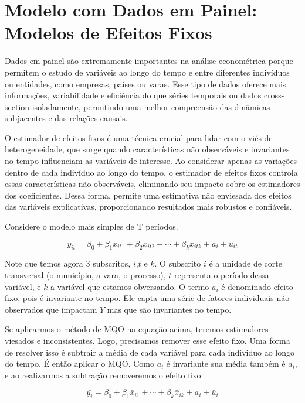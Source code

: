 \documentclass[
  letterpaper,
  DIV=11,
  numbers=noendperiod]{scrreprt}
\begin{document}
\section{Modelo com Dados em Painel: Modelos de Efeitos
Fixos}\label{modelo-com-dados-em-painel-modelos-de-efeitos-fixos}

Dados em painel são extremamente importantes na análise econométrica
porque permitem o estudo de variáveis ao longo do tempo e entre
diferentes indivíduos ou entidades, como empresas, países ou varas. Esse
tipo de dados oferece mais informações, variabilidade e eficiência do
que séries temporais ou dados cross-section isoladamente, permitindo uma
melhor compreensão das dinâmicas subjacentes e das relações causais.

O estimador de efeitos fixos é uma técnica crucial para lidar com o viés
de heterogeneidade, que surge quando características não observáveis e
invariantes no tempo influenciam as variáveis de interesse. Ao
considerar apenas as variações dentro de cada indivíduo ao longo do
tempo, o estimador de efeitos fixos controla essas características não
observáveis, eliminando seu impacto sobre os estimadores dos
coeficientes. Dessa forma, permite uma estimativa não enviesada dos
efeitos das variáveis explicativas, proporcionando resultados mais
robustos e confiáveis.

Considere o modelo mais simples de T períodos.

\[y_{it} = \beta_0 + \beta_1 x_{it1} + \beta_2 x_{it2} + \cdots + \beta_k x_{itk} + a_i + u_{it}\]

Note que temos agora 3 subscritos, \(i\),\(t\) e \(k\). O subscrito
\(i\) é a unidade de corte transversal (o município, a vara, o
processo), \(t\) representa o período dessa variável, e \(k\) a variável
que estamos obversando. O termo \(a_i\) é denominado efeito fixo, pois é
invariante no tempo. Ele capta uma série de fatores individuais não
observados que impactam \(Y\) mas que são invariantes no tempo.

Se aplicarmos o método de MQO na equação acima, teremos estimadores
viesados e inconsistentes. Logo, precisamos remover esse efeito fixo.
Uma forma de resolver isso é subtrair a média de cada variável para cada
individuo ao longo do tempo. É então aplicar o MQO. Como \(a_i\) é
invariante sua média também é \(a_i\), e ao realizarmos a subtração
removeremos o efeito fixo.

\[\bar{y_i} = \beta_0 + \beta_1 \bar{x}_{i1} + \cdots + \beta_k \bar{x}_{ik} + a_i + \bar{u}_i\]
\end{document}
